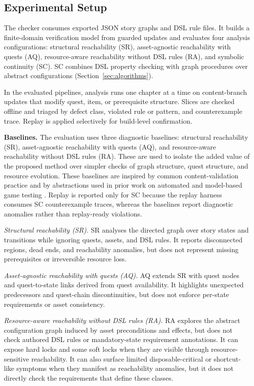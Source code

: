 \documentclass[conference]{IEEEtran}
\begin{document}
\subsection{Experimental Setup}
\label{sec:setup}

The checker consumes exported JSON story graphs and DSL rule files. It
builds a finite-domain verification model from guarded updates and
evaluates four analysis configurations: structural reachability (SR),
asset-agnostic reachability with quests (AQ), resource-aware reachability
without DSL rules (RA), and symbolic continuity (SC). SC combines DSL
property checking with graph procedures over abstract configurations
(Section~\ref{sec:algorithms}).

In the evaluated pipelines, analysis runs one chapter at a time on
content-branch updates that modify quest, item, or prerequisite
structure. Slices are checked offline and triaged by defect class,
violated rule or pattern, and counterexample trace. Replay is applied
selectively for build-level confirmation.

\noindent\textbf{Baselines.}
The evaluation uses three diagnostic baselines: structural reachability
(SR), asset-agnostic reachability with quests (AQ), and resource-aware
reachability without DSL rules (RA).
These are used to isolate the added value of the
proposed method over simpler checks of graph structure, quest structure,
and resource evolution. These baselines are inspired by common
content-validation practice and by abstractions used in prior work on
automated and model-based game testing
\cite{Shirzadeh2022Experience,Politowski2021SurveyVGT,Prasetya2025MBTGames,Iftikhar2015MBTPlatformGames}.
Replay is reported only for SC because the replay harness consumes SC
counterexample traces, whereas the baselines report diagnostic anomalies
rather than replay-ready violations.


\textit{Structural reachability (SR).}
SR analyses the directed graph over story states and transitions while
ignoring quests, assets, and DSL rules. It reports disconnected regions,
dead ends, and reachability anomalies, but does not represent missing
prerequisites or irreversible resource loss.

\textit{Asset-agnostic reachability with quests (AQ).}
AQ extends SR with quest nodes and quest-to-state links derived from
quest availability. It highlights unexpected predecessors and quest-chain
discontinuities, but does not enforce per-state requirements or asset
consistency.

\textit{Resource-aware reachability without DSL rules (RA).}
RA explores the abstract configuration graph induced by asset
preconditions and effects, but does not check authored DSL rules or
mandatory-state requirement annotations. It can expose hard locks and
some soft locks when they are visible through resource-sensitive
reachability. It can also surface limited disposable-critical or
shortcut-like symptoms when they manifest as reachability anomalies, but
it does not directly check the requirements that define these classes.
\end{document}
